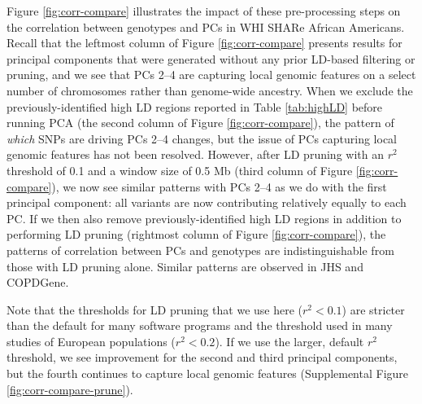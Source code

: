 \documentclass[12pt]{article}
\begin{document}
Figure \ref{fig:corr-compare} illustrates the impact of these pre-processing steps on the correlation between genotypes and PCs in WHI SHARe African Americans. 
Recall that the leftmost column of Figure \ref{fig:corr-compare} presents results for principal components that were generated without any prior LD-based filtering or pruning, and we see that PCs 2--4 are capturing local genomic features on a select number of chromosomes rather than genome-wide ancestry.
When we exclude the previously-identified high LD regions reported in Table \ref{tab:highLD} before running PCA (the second column of Figure \ref{fig:corr-compare}), the pattern of \textit{which} SNPs are driving PCs 2--4 changes, but the issue of PCs capturing local genomic features has not been resolved. 
However, after LD pruning with an $r^2$ threshold of 0.1 and a window size of 0.5 Mb (third column of Figure \ref{fig:corr-compare}), we now see similar patterns with PCs 2--4 as we do with the first principal component: all variants are now contributing relatively equally to each PC. 
If we then also remove previously-identified high LD regions in addition to performing LD pruning (rightmost column of Figure \ref{fig:corr-compare}), the patterns of correlation between PCs and genotypes are indistinguishable from those with LD pruning alone. 
Similar patterns are observed in JHS and COPDGene.

Note that the thresholds for LD pruning that we use here ($r^2 < 0.1$) are stricter than the default for many software programs and the threshold used in many studies of European populations ($r^2 < 0.2$).
If we use the larger, default $r^2$ threshold, we see improvement for the second and third principal components, but the fourth continues to capture local genomic features (Supplemental Figure \ref{fig:corr-compare-prune}). 
\end{document}
